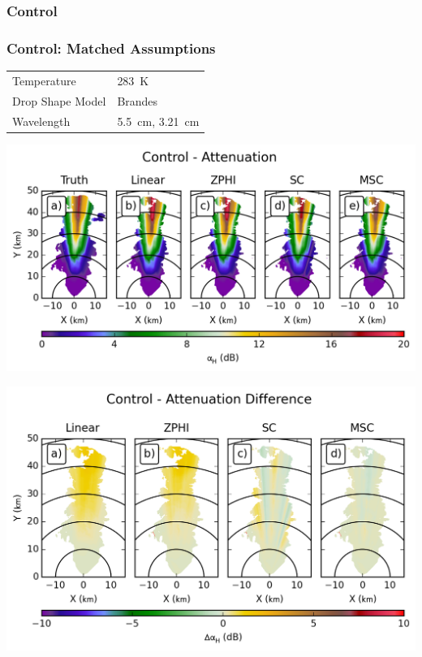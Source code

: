 \documentclass[red]{beamer}
\begin{document}
\subsubsection{Control}
\begin{frame}
	\frametitle{Control: Matched Assumptions}
	\begin{center}
	    \begin{tabular}{ | l | l | }
	        \hline
	        Temperature & \SI{283}{\kelvin} \\
	        Drop Shape Model & Brandes \\
	        Wavelength & \SI{5.5}{\centi\meter}, \SI{3.21}{\centi\meter} \\
			\hline
	    \end{tabular}
	\end{center}	
\end{frame}

\begin{frame}
    \begin{center}
        \includegraphics[scale=0.7]{figures/C_Control_Attenuation_H}
    \end{center}
\end{frame}

\begin{frame}
    \begin{center}
        \includegraphics[scale=0.7]{figures/C_Control_Attenuation_Difference_H}
    \end{center}
\end{frame}
\end{document}
